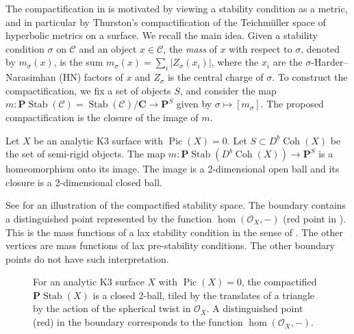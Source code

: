 \documentclass{amsart}
\begin{document}
The compactification in \cite{bap.deo.lic:20} is motivated by viewing a stability condition as a metric, and in particular by Thurston's compactification of the Teichm\"uller space of hyperbolic metrics on a surface.
We recall the main idea.
Given a stability condition \(\sigma\) on \(\mathcal{C}\) and an object \(x \in \mathcal{C}\), the \emph{mass} of \(x\) with respect to \(\sigma\), denoted by \(m_{\sigma}(x)\), is the sum
\( m_{\sigma}(x) = \sum_i |Z_{\sigma}(x_i)|\),
where the \(x_i\) are the \(\sigma\)-Harder--Narasimhan (HN) factors of \(x\) and \(Z_{\sigma}\) is the central charge of \(\sigma\).
To construct the compactification, we fix a set of objects \(S\), and consider the map
\(m \colon \mathbf{P} \operatorname{Stab}(\mathcal{C}) = \operatorname{Stab}(\mathcal{C}) / \mathbf{C} \to \mathbf{P}^S\)
given by \(\sigma \mapsto [m_{\sigma}]\).
The proposed compactification is the closure of the image of \(m\).
\begin{theorem}\label{thm:main}
  Let \(X\) be an analytic K3 surface with \(\operatorname{Pic}(X) = 0\).
  Let \(S \subset D^b\operatorname{Coh} (X)\) be the set of semi-rigid objects.
  The map \(m \colon \mathbf{P} \operatorname{Stab}(D^b \operatorname{Coh}(X)) \to \mathbf{P}^S\) is a homeomorphism onto its image.
  The image is a 2-dimensional open ball and its closure is a 2-dimensional closed ball.
\end{theorem}
See  for an illustration of the compactified stability space.
The boundary contains a distinguished point represented by the function \(\hom(\mathcal{O}_X,-)\) (red point in ).
This is the mass functions of a lax stability condition in the sense of \cite{bro.pau.plo.ea:22}.
The other vertices are mass functions of lax pre-stability conditions.
The other boundary points do not have such interpretation.
\begin{figure}[ht]
  \centering
    \caption{For an analytic K3 surface \(X\) with \(\operatorname{Pic}(X)= 0\), the compactified \(\mathbf{P} \operatorname{Stab}(X)\) is a closed 2-ball, tiled by the translates of a triangle by the action of the spherical twist in \(\mathcal{O}_X\).  A distinguished point (red) in the boundary corresponds to the function \(\hom(\mathcal{O}_X, -)\).}
    \label{fig:disk}
  \end{figure}
\end{document}

